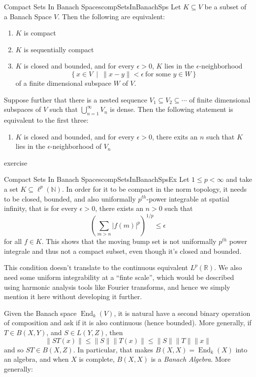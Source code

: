 \documentclass[oneside]{book}
\newcommand{\N}{\mathbb{N}}
\newcommand{\R}{\mathbb{R}}
\newcommand{\sse}{\subseteq}
\newcommand{\End}{\operatorname{End}}
\newcommand{\set}[2]{\left\{#1 \ \middle|\ #2\right\}}
\begin{document}
\begin{prop}{Compact Sets In Banach Spaces}{compSetsInBanachSps}
	Let $K \sse V$ be a subset of a Banach Space $V$. Then the following are equivalent:
	\begin{enumerate}
		\item $K$ is compact
		\item $K$ is sequentially compact
		\item $K$ is closed and bounded, and for every $\epsilon > 0$, $K$ lies in the $\epsilon$-neighborhood
			\[
				\set{x \in V}{\|x-y\| < \epsilon\ \text{for some $y \in W$}}
			\]
			of a finite dimensional subspace $W$ of $V$.
	\end{enumerate}
	Suppose further that there is a nested sequence $V_1 \sse V_2 \sse \cdots$ of finite dimensional subspaces of
	$V$ such that $\bigcup_{n=1}^\infty V_n$ is dense. Then the following statement is equivalent to the first
	three:
	\begin{enumerate}
		\item[4.] $K$ is closed and bounded, and for every $\epsilon > 0$, there exits an $n$ such that
			$K$ lies in the $\epsilon$-neighborhood of $V_n$
	\end{enumerate}
\end{prop}

\begin{Proof}
	exercise
\end{Proof}

\begin{example}{Compact Sets In Banach Spaces}{compSetsInBanachSpsEx}
	Let $1 \le p < \infty$ and take a set $K \sse \ell^p(\N)$. In order for it to be compact in the norm topology,
	it needs to be closed, bounded, and also uniformally $p^{th}$-power integrable at spatial infinity, that
	is for every $\epsilon > 0$, there exists an $n > 0$ such that
	\[
		\left(\sum_{m > n} |f(m)|^p\right)^{1/p} \le \epsilon
	\]
	for all $f \in K$. This shows that the moving bump set is not uniformally $p^{th}$ power integrale and thus
	not a compact subset, even though it's closed and bounded.


	This condition doesn't translate to the continuous equivalent $L^p(\R)$. We also need some uniform
	integrability at a ``finte scale'', which would be described using harmonic analysis tools like Fourier
	transforms, and hence we simply mention it here without developing it further.
\end{example}

Given the Banach space $\End_k(V)$, it is natural have a second binary operation of composition and ask if it is also
continuous (hence bounded). More generally, if $T \in B(X,Y)$, and $S \in L(Y,Z)$, then
\[
	\|ST(x)\| \le \|S\|\|T(x)\| \le \|S\|\|T\|\|x\|
\]
and so $ST \in B(X,Z)$. In particular, that makes $B(X,X) = \End_k(X)$ into an algebra, and when $X$ is complete, $B(X,X)$ is
a \emph{Banach Algebra}.  More generally:
\end{document}

